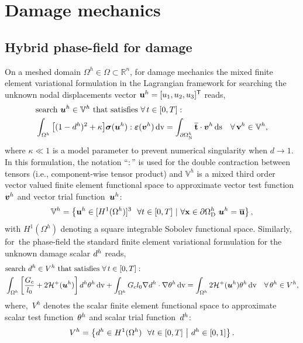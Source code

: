 \pagebreak













\section{Damage mechanics}
\subsection{Hybrid phase-field for damage}
On a meshed domain $\Omega^h\in\Omega\subset\mathbb{R}^n$, for damage mechanics the mixed finite element variational formulation in the Lagrangian framework for searching the unknown nodal displacements vector ${\bf{u}}^h=[u_1,u_2,u_3]^\mathsf{T}$ reads,
%
%
\begin{equation}\label{Eq:VarfU}
\begin{aligned}
&\text{search}~\boldsymbol u^h\in\mathbb{V}^h \text{~that satisfies}~\forall\, t\in[0,T]:\\
&\int_{\Omega^h}\big[(1-d^h)^2 + \kappa \big]\boldsymbol{\sigma}(\boldsymbol u^h) : \boldsymbol{\varepsilon}(\boldsymbol v^h) \,\mathrm{d}\text{v}= \int_{\partial\Omega^h_\text{N}} \overline{{\bf t}}\cdot\boldsymbol v^h \,\mathrm{d}\text{s} \quad\forall\,{\bf{v}}^h\in\mathbb{V}^h,
\end{aligned}
\end{equation}
where $\kappa\ll1$ is a model parameter to prevent numerical singularity when $d \to 1$.
In this formulation, the notation ``$:$'' is used for the double contraction between tensors (i.e., component-wise tensor product) and $ \mathbb{V}^h $ is a  mixed third order vector valued finite element functional space to approximate vector test function~$\boldsymbol v^h$ and vector trial function~$\boldsymbol u^h$:
\begin{equation}
\mathbb{V}^h=\left\{ {\bf{u}}^h\in [ {H}^1(\Omega^h) ]^3~~\forall t\in[0,T]~|~ \forall {\bf{x}}\in\partial\Omega^h_{\text{D}}~\boldsymbol u^h=\overline{{\bf{u}}}\right\},
\end{equation}
%
with ${H}^1(\Omega^h)$ denoting a square integrable Sobolev functional space.
Similarly, for~the phase-field the standard finite element variational formulation for the unknown damage scalar $d^h$ reads, 
%
%
\begin{equation}
\begin{aligned}\label{Eq:VarfPhi}
&\text{search}~d^h\in{{V}}^h \text{~that satisfies}~\forall\, t\in[0,T]:\\
&\int_{\Omega^h}\left[ \frac{G_{\text{c}}}{l_0} + 2 \mathcal{H}^{+}(\boldsymbol u^h) \right]d^h\theta^h\, \mathrm{d}\text{v} + \int_{\Omega^h} {G_{\text{c}}}{l_0}\nabla d^h \cdot \nabla\theta^h \, \mathrm{d}\text{v}= \int_{\Omega^h} 2\mathcal{H}^{+}(\boldsymbol u^h)\theta^h \, \mathrm{d}\text{v}\quad\forall\,\theta^h\in{{V}}^h, 
\end{aligned}
\end{equation}
%
%
where,~${{V}}^h$ denotes the scalar finite element functional space to approximate scalar test function~$\theta^h$ and scalar trial function~$d^h$:
\begin{equation}
{{V}}^h=\left\{d^h \in  {H}^1(\Omega^h)~~\forall t\in[0,T]~\middle|~d^h\in[0,1]  \right\}.
\end{equation}


